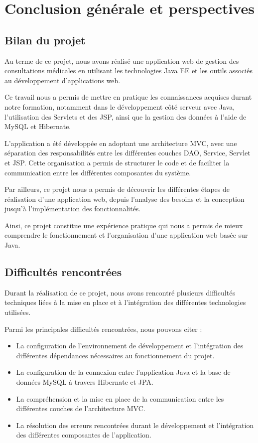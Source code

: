 
\chapter{Conclusion générale et perspectives}

\section{Bilan du projet}

Au terme de ce projet, nous avons réalisé une application web de gestion des consultations médicales en utilisant les technologies Java EE et les outils associés au développement d'applications web.

Ce travail nous a permis de mettre en pratique les connaissances acquises durant notre formation, notamment dans le développement côté serveur avec Java, l'utilisation des Servlets et des JSP, ainsi que la gestion des données à l'aide de MySQL et Hibernate.

L'application a été développée en adoptant une architecture MVC, avec une séparation des responsabilités entre les différentes couches DAO, Service, Servlet et JSP. Cette organisation a permis de structurer le code et de faciliter la communication entre les différentes composantes du système.

Par ailleurs, ce projet nous a permis de découvrir les différentes étapes de réalisation d'une application web, depuis l'analyse des besoins et la conception jusqu'à l'implémentation des fonctionnalités.

Ainsi, ce projet constitue une expérience pratique qui nous a permis de mieux comprendre le fonctionnement et l'organisation d'une application web basée sur Java.

\section{Difficultés rencontrées}

Durant la réalisation de ce projet, nous avons rencontré plusieurs difficultés techniques liées à la mise en place et à l'intégration des différentes technologies utilisées.

Parmi les principales difficultés rencontrées, nous pouvons citer :

\begin{itemize}
	\item La configuration de l'environnement de développement et l'intégration des différentes dépendances nécessaires au fonctionnement du projet.
	
	\item La configuration de la connexion entre l'application Java et la base de données MySQL à travers Hibernate et JPA.
	
	\item La compréhension et la mise en place de la communication entre les différentes couches de l'architecture MVC.
	
	
	\item La résolution des erreurs rencontrées durant le développement et l'intégration des différentes composantes de l'application.
\end{itemize}

